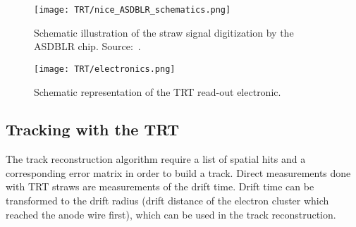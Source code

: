 \begin{figure}
\centering
\texttt{[image: TRT/nice\_ASDBLR\_schematics.png]}
\caption{ 
 Schematic illustration of the straw signal digitization by the ASDBLR chip. Source:~\cite{Aad:2008zzm}.
}
\label{fig:nice_asdblr_schematics}
\end{figure}


\begin{figure}
\centering
\texttt{[image: TRT/electronics.png]}
\caption{ 
 Schematic representation of the TRT read-out electronic.
}
\label{fig:electronics}
\end{figure}



\subsection{Tracking with the TRT}
\label{subsec:tracking_with_trt}

The track reconstruction algorithm require a list of spatial hits and a corresponding error matrix in order to build a track.
Direct measurements done with TRT straws are measurements of the drift time. Drift time can be transformed to the
drift radius (drift distance of the electron cluster which reached the anode wire first), which can be used in the track reconstruction.

